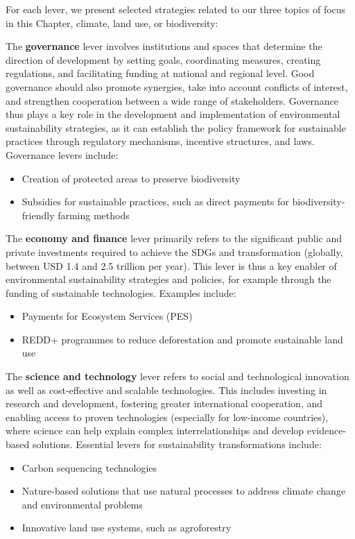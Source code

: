 \documentclass[
  a4paper,
  openany]{book}
\begin{document}
For each lever, we present selected strategies related to our three
topics of focus in this Chapter, climate, land use, or biodiversity:

The \textbf{governance} lever involves institutions and spaces that
determine the direction of development by setting goals, coordinating
measures, creating regulations, and facilitating funding at national and
regional level. Good governance should also promote synergies, take into
account conflicts of interest, and strengthen cooperation between a wide
range of stakeholders. Governance thus plays a key role in the
development and implementation of environmental sustainability
strategies, as it can establish the policy framework for sustainable
practices through regulatory mechanisms, incentive structures, and laws.
Governance levers include:

\begin{itemize}
\item
  Creation of protected areas to preserve biodiversity
\item
  Subsidies for sustainable practices, such as direct payments for
  biodiversity-friendly farming methods
\end{itemize}

The \textbf{economy and finance} lever primarily refers to the
significant public and private investments required to achieve the SDGs
and transformation (globally, between USD 1.4 and 2.5 trillion per
year). This lever is thus a key enabler of environmental sustainability
strategies and policies, for example through the funding of sustainable
technologies. Examples include:

\begin{itemize}
\item
  Payments for Ecosystem Services (PES)
\item
  REDD+ programmes to reduce deforestation and promote sustainable land
  use
\end{itemize}

The \textbf{science and technology} lever refers to social and
technological innovation as well as cost-effective and scalable
technologies. This includes investing in research and development,
fostering greater international cooperation, and enabling access to
proven technologies (especially for low-income countries), where science
can help explain complex interrelationships and develop evidence-based
solutions. Essential levers for sustainability transformations include:

\begin{itemize}
\item
  Carbon sequencing technologies
\item
  Nature-based solutions that use natural processes to address climate
  change and environmental problems
\item
  Innovative land use systems, such as agroforestry\\
\end{itemize}
\end{document}
